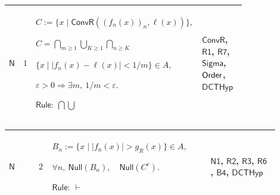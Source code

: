 \documentclass[12pt,reqno]{amsart}
\theoremstyle{blueplain}
\numberwithin{equation}{section}
\newlength{\DCTOneColumnBody}
\begin{document}
{\scriptsize \setlength{\parskip}{0pt}\nointerlineskip
\noindent 
\begin{tabular}{|@{}>{\centering\arraybackslash}m{\DCTOneColumnBody}|}
\hline
$\displaystyle \mathsf{Context\_N}:=$\par$\displaystyle f:\mathsf{PosNat}\to%
\mathsf{RF},\quad\ell:\mathsf{RF},\quad g:\mathsf{G},$\par$\displaystyle 
\mathsf{DCTHyp}(f,\ell,g),\quad g_R:=\lambda x,\ (g(x):\mathsf{Real}).$ \\ 
\hline
\end{tabular}%
}

{\scriptsize \setlength{\parskip}{0pt}\nointerlineskip
\noindent 
\begin{tabular}{|@{}>{\centering\arraybackslash}m{0.10658\linewidth}|>{\centering\arraybackslash}m{0.03553\linewidth}|>{\centering\arraybackslash}m{0.52105\linewidth}|>{\centering\arraybackslash}m{0.23684\linewidth}|}
\hline
\hypertarget{dct:N1}{$\displaystyle \mathsf{N}$} & $\displaystyle 1$ & $%
\displaystyle C:=\{x\mid\mathsf{ConvR}((f_n(x))_n,\ell(x))\},$\par$%
\displaystyle C=\bigcap_{m\ge1}\bigcup_{K\ge1}\bigcap_{n\ge K}$\par$%
\displaystyle \{x\mid |f_n(x)-\ell(x)|<1/m\}\in A,$\par$\displaystyle %
\varepsilon>0\Rightarrow\exists m,\ 1/m<\varepsilon.$\par$\displaystyle 
\mathsf{Rule}:\ \bigcap\bigcup$ & \hyperlink{dctdef:ConvR}{$\displaystyle 
\mathsf{ConvR}$}, \hyperlink{dct:R1}{$\displaystyle \mathsf{R1}$}, 
\hyperlink{dct:R7}{$\displaystyle \mathsf{R7}$}, \hyperlink{ax:Sigma}{$%
\displaystyle \mathsf{Sigma}$}, \hyperlink{ax:Order}{$\displaystyle \mathsf{%
Order}$}, \hyperlink{dctdef:DCTHyp}{$\displaystyle \mathsf{DCTHyp}$} \\ 
\hline
\end{tabular}%
}

{\scriptsize \setlength{\parskip}{0pt}\nointerlineskip
\noindent 
\begin{tabular}{|@{}>{\centering\arraybackslash}m{0.10658\linewidth}|>{\centering\arraybackslash}m{0.03553\linewidth}|>{\centering\arraybackslash}m{0.52105\linewidth}|>{\centering\arraybackslash}m{0.23684\linewidth}|}
\hline
\hypertarget{dct:N2}{$\displaystyle \mathsf{N}$} & $\displaystyle 2$ & $%
\displaystyle B_n:=\{x\mid |f_n(x)|>g_R(x)\}\in A,$\par$\displaystyle %
\forall n,\ \mathsf{Null}(B_n),\quad\mathsf{Null}(C^c).$\par$\displaystyle 
\mathsf{Rule}:\ \vdash$ & \hyperlink{dct:N1}{$\displaystyle \mathsf{N1}$}, 
\hyperlink{dct:R2}{$\displaystyle \mathsf{R2}$}, \hyperlink{dct:R3}{$%
\displaystyle \mathsf{R3}$}, \hyperlink{dct:R6}{$\displaystyle \mathsf{R6}$}%
, \hyperlink{dct:B4}{$\displaystyle \mathsf{B4}$}, \hyperlink{dctdef:DCTHyp}{%
$\displaystyle \mathsf{DCTHyp}$} \\ \hline
\end{tabular}%
}
\end{document}
